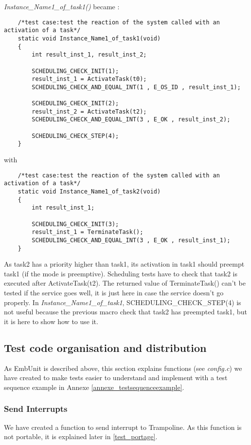 \documentclass[10pt]{article}
\begin{document}
	\textit{Instance\_Name1\_of\_task1()} became :
	\begin{lstlisting}
	/*test case:test the reaction of the system called with an activation of a task*/
	static void Instance_Name1_of_task1(void)
	{	
		int result_inst_1, result_inst_2;
	
		SCHEDULING_CHECK_INIT(1);
		result_inst_1 = ActivateTask(t0);
		SCHEDULING_CHECK_AND_EQUAL_INT(1 , E_OS_ID , result_inst_1);
	
		SCHEDULING_CHECK_INIT(2);
		result_inst_2 = ActivateTask(t2);
		SCHEDULING_CHECK_AND_EQUAL_INT(3 , E_OK , result_inst_2);
		
		SCHEDULING_CHECK_STEP(4);
	}
	\end{lstlisting}
	with
	\begin{lstlisting}
	/*test case:test the reaction of the system called with an activation of a task*/
	static void Instance_Name1_of_task2(void)
	{	
		int result_inst_1;
	
		SCHEDULING_CHECK_INIT(3);
		result_inst_1 = TerminateTask();
		SCHEDULING_CHECK_AND_EQUAL_INT(3 , E_OK , result_inst_1);
	}
	\end{lstlisting}
	As task2 has a priority higher than task1, its activation in task1 should preempt task1 (if the mode is preemptive). Scheduling tests have to check that task2 is executed after ActivateTask(t2). The returned value of TerminateTask() can't be tested if the service goes well, it is just here in case the service doesn't go properly. In \textit{Instance\_Name1\_of\_task1}, SCHEDULING\_CHECK\_STEP(4) is not useful because the previous macro check that task2 has preempted task1, but it is here to show how to use it.

\subsection{Test code organisation and distribution}
	As EmbUnit is described above, this section explains functions (see \textit{config.c}) we have created to make tests easier to understand and implement with a test sequence example in Annexe \ref{annexe_testsequenceexample}.
	
	\subsubsection{Send Interrupts}
	We have created a function to send interrupt to Trampoline. As this function is not portable, it is explained later in \ref{test_portage}.
		
\end{document}
